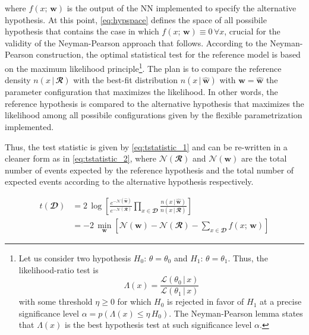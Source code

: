 \noindent where $f(x;\,\mathbf{w})$ is the output of the NN implemented to specify the alternative hypothesis. At this
point, \autoref{eq:hypspace} defines the space of all possibile hypothesis that contains the case in which
$f(x;\,\mathbf{w})\equiv 0 \,\forall x$, crucial for the validity of the Neyman-Pearson approach that follows. According
to the Neyman-Pearson construction, the optimal statistical test for the reference model is based on the maximum
likelihood principle\footnote{Let us consider two hypothesis $H_0:\,\theta=\theta_0$ and $H_1:\,\theta=\theta_1$. Thus,
the likelihood-ratio test is
\begin{equation*}
    \Lambda(x)=\frac{\mathcal{L}(\theta_0\,|\,x)}{\mathcal{L}(\theta_1\,|\,x)}
\end{equation*}
\noindent with some threshold $\eta \ge 0$ for which $H_0$ is rejected in favor of $H_1$ at a precise significance level
$\alpha = p(\Lambda(x) \le \eta \, H_0)$. The Neyman-Pearson lemma states that $\Lambda(x)$ is the best hypothesis test
at such significance level $\alpha$.}. The plan is to compare the reference density $n(x\,|\,\mathbfcal{R})$ with the
best-fit distribution $n(x\,|\,\widehat{\mathbf{w}})$ with $\mathbf{w}=\widehat{\mathbf{w}}$ the parameter configuration
that maximizes the likelihood. In other words, the reference hypothesis is compared to the alternative hypothesis that
maximizes the likelihood among all possibile configurations given by the flexible parametrization implemented.

Thus, the test statistic is given by \autoref{eq:tstatistic_1} and can be re-written in a cleaner form as in
\autoref{eq:tstatistic_2}, where $\mathcal{N}(\mathbfcal{R})$ and $\mathcal{N}(\mathbf{w})$ are the total number of
events expected by the reference hypothesis and the total number of expected events according to the alternative
hypothesis respectively.

\begin{align}
    t(\mathbfcal{D}) & = 2 \, \log \left[
        \frac{
            e^{-\mathcal{N}(\widehat{\mathbf{w}})}
        }{
            e^{-\mathcal{N}(\mathbfcal{R})}
        }
        \prod_{x \in \mathbfcal{D}}
        \frac{
            n(x\,|\,\widehat{\mathbf{w}})  
        }{
            n(x\,|\,\mathbfcal{R})
        }
    \right] \label{eq:tstatistic_1}\\
    & = -2\,\min_{\mathbf{w}} \left[
        \mathcal{N}(\mathbf{w})-\mathcal{N}(\mathbfcal{R}) - \sum_{x \in \mathbfcal{D}}  f(x;\,\mathbf{w})
    \right] \label{eq:tstatistic_2}
\end{align}

